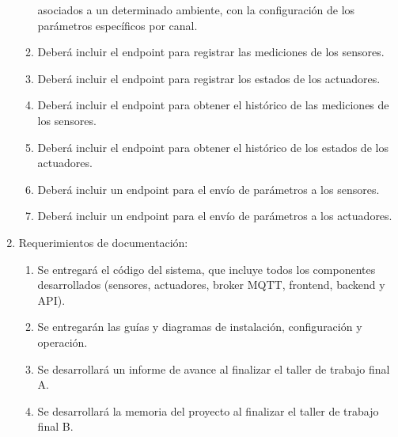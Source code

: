 \begin{enumerate}
\begin{enumerate}
		            asociados a un determinado ambiente, con la configuración de los parámetros
		            específicos por canal.
		      \item Deberá incluir el endpoint para registrar las mediciones de los sensores.
		      \item Deberá incluir el endpoint para registrar los estados de los actuadores.
		      \item Deberá incluir el endpoint para obtener el histórico de las mediciones de los
		            sensores.
		      \item Deberá incluir el endpoint para obtener el histórico de los estados de los
		            actuadores.
		      \item Deberá incluir un endpoint para el envío de parámetros a los sensores.
		      \item Deberá incluir un endpoint para el envío de parámetros a los actuadores.
	      \end{enumerate}

	\item Requerimientos de documentación:
	      \begin{enumerate}
		      \item Se entregará el código del sistema, que incluye todos los componentes
		            desarrollados (sensores, actuadores, broker MQTT, frontend, backend y API).
		      \item Se entregarán las guías y diagramas de instalación, configuración y operación.
		      \item Se desarrollará un informe de avance al finalizar el taller de trabajo final A.
		      \item Se desarrollará la memoria del proyecto al finalizar el taller de trabajo final B.
	      \end{enumerate}
\end{enumerate}
